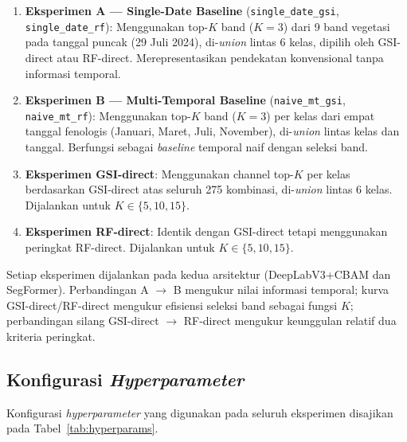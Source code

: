 \begin{enumerate}
    \item \textbf{Eksperimen A — Single-Date Baseline} (\texttt{single\_date\_gsi}, \texttt{single\_date\_rf}): Menggunakan top-$K$ band ($K=3$) dari 9 band vegetasi pada tanggal puncak (29 Juli 2024), di-\textit{union} lintas 6 kelas, dipilih oleh GSI-direct atau RF-direct. Merepresentasikan pendekatan konvensional tanpa informasi temporal.

    \item \textbf{Eksperimen B — Multi-Temporal Baseline} (\texttt{naive\_mt\_gsi}, \texttt{naive\_mt\_rf}): Menggunakan top-$K$ band ($K=3$) per kelas dari empat tanggal fenologis (Januari, Maret, Juli, November), di-\textit{union} lintas kelas dan tanggal. Berfungsi sebagai \textit{baseline} temporal naif dengan seleksi band.

    \item \textbf{Eksperimen GSI-direct}: Menggunakan channel top-$K$ per kelas berdasarkan GSI-direct atas seluruh 275 kombinasi, di-\textit{union} lintas 6 kelas. Dijalankan untuk $K \in \{5, 10, 15\}$.

    \item \textbf{Eksperimen RF-direct}: Identik dengan GSI-direct tetapi menggunakan peringkat RF-direct. Dijalankan untuk $K \in \{5, 10, 15\}$.
\end{enumerate}

Setiap eksperimen dijalankan pada kedua arsitektur (DeepLabV3+CBAM dan SegFormer).
Perbandingan A $\to$ B mengukur nilai informasi temporal; kurva GSI-direct/RF-direct mengukur efisiensi seleksi band sebagai fungsi $K$; perbandingan silang GSI-direct $\to$ RF-direct mengukur keunggulan relatif dua kriteria peringkat.

\subsection{Konfigurasi \textit{Hyperparameter}}

Konfigurasi \textit{hyperparameter} yang digunakan pada seluruh eksperimen disajikan pada Tabel~\ref{tab:hyperparams}.

